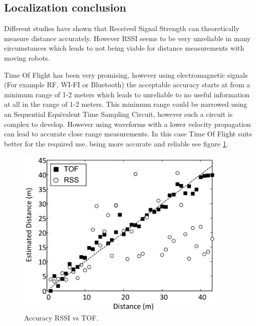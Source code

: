 \documentclass[10pt,a4paper]{article}
\begin{document}
\subsection{Localization conclusion}
Different studies have shown that Received Signal Strength can theoretically measure distance accurately. However RSSI seems to be very unreliable in many circumstances which leads to not being viable for distance measurements with moving robots. 

Time Of Flight has been very promising, however using electromagnetic signals (For example RF, WI-FI or Bluetooth) the acceptable accuracy starts at from a minimum range of 1-2 meters which leads to unreliable to no useful information at all in the range of 1-2 meters. This minimum range could be narrowed using an Sequential Equivalent Time Sampling Circuit, however such a circuit is complex to develop. However using waveforms with a lower velocity propagation can lead to accurate close range measurements. In this case Time Of Flight suits better for the required use, being more accurate and reliable see figure \ref{RSSIvsTOF}.\cite{TOF}

\begin{figure}[H]
\centering
\includegraphics[width=0.9\textwidth]{RSSIvsTOF.pdf}
\caption{Accuracy RSSI vs TOF.\cite{TOF}} 
\label{RSSIvsTOF}
\end{figure}
\end{document}
